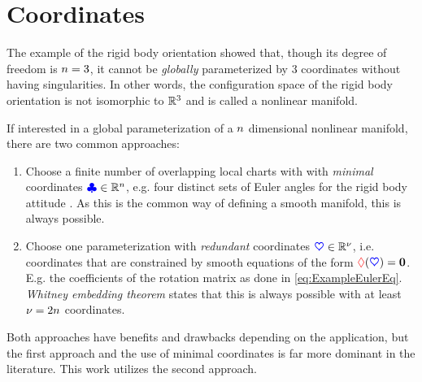 \section{Coordinates}\label{sec:MathCoordinates}
The example of the rigid body orientation showed that, though its degree of freedom is $n=3$, it cannot be \textit{globally} parameterized by 3 coordinates without having singularities.
In other words, the configuration space of the rigid body orientation is not isomorphic to $\mathbb{R}^3$ and is called a nonlinear manifold.

If interested in a global parameterization of a $n$ dimensional nonlinear manifold, there are two common approaches:
\begin{enumerate}
 \item Choose a finite number of overlapping local charts with with \textit{minimal} coordinates $\boldsymbol{\textcolor{blue}{\clubsuit}} \in \mathbb{R}^n$, e.g. four distinct sets of Euler angles for the rigid body attitude \cite{Grafarend:AtlasSO3}.
 As this is the common way of defining a smooth manifold, this is always possible.
 \item Choose one parameterization with \textit{redundant} coordinates $\boldsymbol{\textcolor{blue}{\heartsuit}} \in \mathbb{R}^{\nu}$, i.e. coordinates that are constrained by smooth equations of the form $\boldsymbol{\textcolor{red}{\Diamond}}(\boldsymbol{\textcolor{blue}{\heartsuit}}) = \boldsymbol{0}$.
 E.g. the coefficients of the rotation matrix as done in \eqref{eq:ExampleEulerEq}.
 \textit{Whitney embedding theorem} states that this is always possible with at least $\nu = 2n$ coordinates.
\end{enumerate}
Both approaches have benefits and drawbacks depending on the application, but the first approach and the use of minimal coordinates is far more dominant in the literature.
This work utilizes the second approach.


